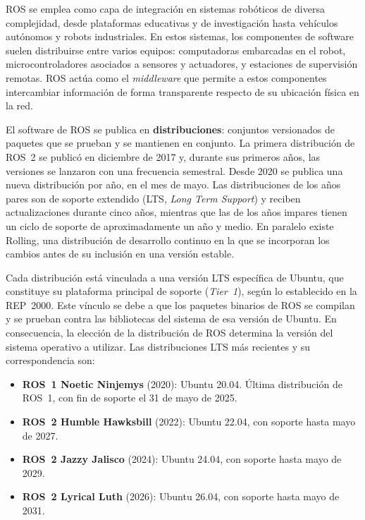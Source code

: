 ROS se emplea como capa de integración en sistemas robóticos de diversa
complejidad, desde plataformas educativas y de investigación hasta vehículos
autónomos y robots industriales. En estos sistemas, los componentes de
software suelen distribuirse entre varios equipos: computadoras embarcadas en
el robot, microcontroladores asociados a sensores y actuadores, y estaciones de
supervisión remotas. ROS actúa como el \textit{middleware} que permite a
estos componentes intercambiar información de forma transparente respecto de
su ubicación física en la red.

El software de ROS se publica en \textbf{distribuciones}: conjuntos versionados
de paquetes que se prueban y se mantienen en conjunto. La primera distribución
de ROS~2 se publicó en diciembre de 2017 y, durante sus primeros años, las
versiones se lanzaron con una frecuencia semestral. Desde 2020 se publica una
nueva distribución por año, en el mes de mayo. Las distribuciones de los años
pares son de soporte extendido (LTS, \textit{Long Term Support}) y reciben
actualizaciones durante cinco años, mientras que las de los años impares tienen
un ciclo de soporte de aproximadamente un año y medio. En paralelo existe
Rolling, una distribución de desarrollo continuo en la que se incorporan los
cambios antes de su inclusión en una versión estable.

Cada distribución está vinculada a una versión LTS específica de Ubuntu, que
constituye su plataforma principal de soporte (\textit{Tier~1}), según lo
establecido en la REP~2000. Este vínculo se debe a que los paquetes binarios de
ROS se compilan y se prueban contra las bibliotecas del sistema de esa versión
de Ubuntu. En consecuencia, la elección de la distribución de ROS determina la
versión del sistema operativo a utilizar. Las distribuciones LTS más recientes
y su correspondencia son:
\begin{itemize}
    \item \textbf{ROS~1 Noetic Ninjemys} (2020): Ubuntu 20.04. Última
    distribución de ROS~1, con fin de soporte el 31 de mayo de 2025.
    \item \textbf{ROS~2 Humble Hawksbill} (2022): Ubuntu 22.04, con soporte
    hasta mayo de 2027.
    \item \textbf{ROS~2 Jazzy Jalisco} (2024): Ubuntu 24.04, con soporte hasta
    mayo de 2029.
    \item \textbf{ROS~2 Lyrical Luth} (2026): Ubuntu 26.04, con soporte hasta
    mayo de 2031.
\end{itemize}

